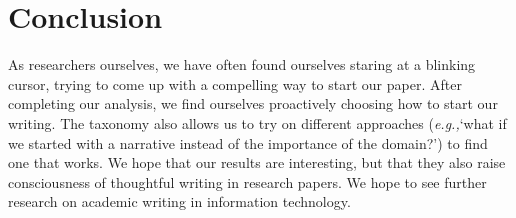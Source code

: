 \documentclass[sigconf,anonymous]{acmart}
\newcommand{\eg}{\textit{e.g.,}\xspace}
\begin{document}
	\section{Conclusion}

	As researchers ourselves, we have often found ourselves staring at a blinking cursor, trying to come up with a compelling way to start our paper. After completing our analysis, we find ourselves proactively choosing how to start our writing. The taxonomy also allows us to try on different approaches (\eg `what if we started with a narrative instead of the importance of the domain?') to find one that works. We hope that our results are interesting, but that they also raise consciousness of thoughtful writing in research papers. We hope to see further research on academic writing in information technology.



	
	
\end{document}
